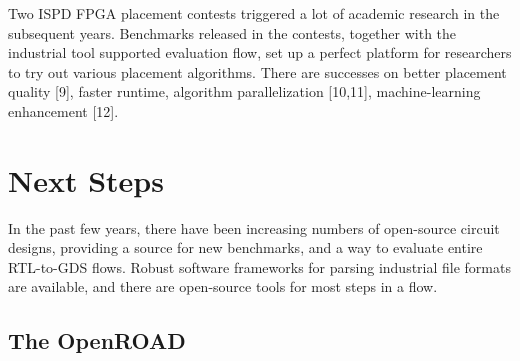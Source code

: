 \documentclass[sigconf]{acmart}
\begin{document}
Two ISPD FPGA placement contests triggered a lot of academic research
in the subsequent years. Benchmarks released in the contests, together
with the industrial tool supported evaluation flow, set up a perfect
platform for researchers to try out various placement
algorithms. There are successes on better placement quality\cite{sy9} [9],
faster runtime, algorithm parallelization\cite{sy10,sy11} [10,11], machine-learning
enhancement\cite{sy12} [12].



\iffalse
\subsection{Deep Learning Accelerator Placement, 2020}

Include this?  Not really placement, but placement-ish?
\fi


\section{Next Steps}

In the past few years, there have been increasing
numbers of open-source circuit designs,
providing a source 
for new benchmarks, and a way to evaluate entire
RTL-to-GDS flows.  Robust software frameworks for
parsing industrial file formats are available,
and there are open-source tools for most steps
in a flow.

\iffalse

Striking a balance between objectives.  Industry groups
would certainly like a production-ready tool, but this is
something that a small team of graduate students can't
build quickly.

Need to capture the essence of a problem, while keeping it
tractable.  Make the benchmark hard to game, so that solutions
actually resemble what we might want ``in practice.''

Trade-off on using library for parsing -- locks into a build
system, sometimes a language and set of tools.  Simple
file formats, by contrast, may lose the essential elements
that matter for an industrial design.

Evaluators, with painstaking detail, are important.

Complex tool flows for evaluation are trouble.

\fi


\subsection{The OpenROAD}
\end{document}
